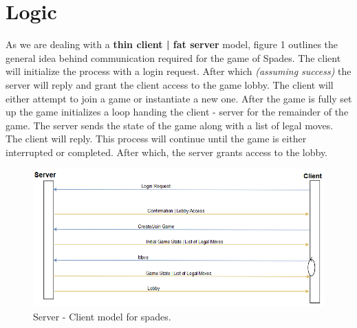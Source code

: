 \section{Logic}

As we are dealing with a \textbf{thin client | fat server} model, figure 1 outlines the general idea behind communication required for the game of Spades. The client will initialize the process with a login request. After which \textit{(assuming success)} the server will reply and grant the client access to the game lobby. The client will either attempt to join a game or instantiate a new one. After the game is fully set up the game initializes a loop handing the client - server for the remainder of the game. The server sends the state of the game along with a list of legal moves. The client will reply. This process will continue until the game is either interrupted or completed. After which, the server grants access to the lobby.  	

\begin{figure}
		\begin{center}
		\includegraphics{graphics/clientServer}
		\caption{Server - Client model for spades.}
		\label{Figure 1}
		\end{center}
	\end{figure}
	
